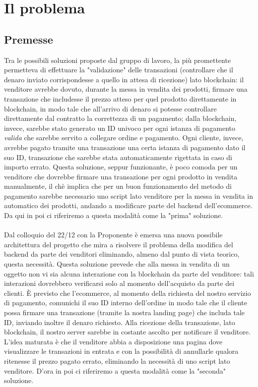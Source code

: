 \documentclass[a4paper, 12pt]{article}
\begin{document}
\makefrontpage

\section{Il problema}

\subsection*{Premesse}
Tra le possibili soluzioni proposte dal gruppo di lavoro, la più promettente permetteva di effettuare la "validazione" delle transazioni (controllare che il denaro inviato corrispondesse a quello in attesa di ricezione) lato blockchain: il venditore avrebbe dovuto, durante la messa in vendita dei prodotti, firmare una transazione che includesse il prezzo atteso per quel prodotto direttamente in blockchain, in modo tale che all'arrivo di denaro si potesse controllare direttamente dal contratto la correttezza di un pagamento; dalla blockchain, invece, sarebbe stato generato un ID univoco per ogni istanza di pagamento \textit{valida}
che sarebbe servito a collegare ordine e pagamento. Ogni cliente, invece, avrebbe pagato tramite una transazione una certa istanza di pagamento dato il suo ID, transazione che sarebbe stata automaticamente rigettata
in caso di importo errato. Questa soluzione, seppur funzionante, è poco comoda per un venditore che dovrebbe firmare una transazione per ogni prodotto in vendita manualmente, il chè implica che per un buon funzionamento del metodo di pagamento sarebbe necessario uno script lato venditore per la messa in vendita in automatico dei prodotti, andando a modificare parte del backend dell'ecommerce.
Da qui in poi ci riferiremo a questa modalità come la "prima" soluzione.\\\\
Dal colloquio del 22/12 con la Proponente è emersa una nuova possibile architettura del progetto che mira a risolvere il problema della modifica del backend da parte dei venditori eliminando, almeno dal punto di vista teorico, questa necessità.
Questa soluzione prevede che alla messa in vendita di un oggetto non vi sia alcuna interazione con la blockchain da parte del venditore: tali interazioni dovrebbero verificarsi solo al momento dell'acquisto da
parte dei clienti. È previsto che l'ecommerce, al momento della richiesta del nostro servizio di pagamento, comunichi il suo ID interno dell'ordine in modo tale che il cliente possa firmare una transazione (tramite la nostra landing page) che includa tale ID, inviando inoltre il denaro richiesto. Alla ricezione della transazione, lato blockchain, il nostro server sarebbe in costante ascolto per notificare il venditore.
L'idea maturata è che il venditore abbia a disposizione una pagina dove visualizzare le transazioni in entrata e con la possibilità di annullarle qualora ritenesse il prezzo pagato errato, eliminando la
necessità di uno script lato venditore. D'ora in poi ci riferiremo a questa modalità come la "seconda" soluzione.
\end{document}
